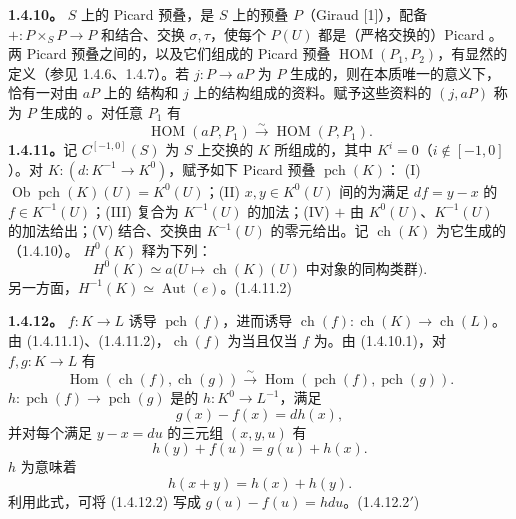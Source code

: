 \textbf{1.4.10。} $S$ 上的 Picard 预叠，是 $S$ 上的预叠 $P$（Giraud [1]），配备 $+:P\times_S P\to P$ 和结合、交换 $\sigma,\tau$，使每个 $P(U)$ 都是（严格交换的）Picard 。两 Picard 预叠之间的，以及它们组成的 Picard 预叠 $\operatorname{HOM}(P_1,P_2)$，有显然的定义（参见 1.4.6、1.4.7）。若 $j:P\to aP$ 为 $P$ 生成的，则在本质唯一的意义下，恰有一对由 $aP$ 上的 结构和 $j$ 上的结构组成的资料。赋予这些资料的 $(j,aP)$ 称为 $P$ 生成的 。对任意  $P_1$ 有
\[\operatorname{HOM}(aP,P_1)\xrightarrow\sim\operatorname{HOM}(P,P_1).\tag{1.4.10.1}\]
\textbf{1.4.11。}记 $C^{[-1,0]}(S)$ 为 $S$ 上交换的 $K$ 所组成的，其中 $K^i=0$（$i\notin[-1,0]$）。对 $K:(d:K^{-1}\to K^0)$，赋予如下 Picard 预叠 $\operatorname{pch}(K)$：
(I) $\operatorname{Ob}\operatorname{pch}(K)(U)=K^0(U)$；(II) $x,y\in K^0(U)$ 间的为满足 $df=y-x$ 的 $f\in K^{-1}(U)$；(III) 复合为 $K^{-1}(U)$ 的加法；(IV)  $+$ 由 $K^0(U)$、$K^{-1}(U)$ 的加法给出；(V) 结合、交换由 $K^{-1}(U)$ 的零元给出。记 $\operatorname{ch}(K)$ 为它生成的 （1.4.10）。 $H^0(K)$ 释为下列：
\[H^0(K)\simeq a\bigl(U\mapsto\operatorname{ch}(K)(U)\text{ 中对象的同构类群}\bigr).\tag{1.4.11.1}\]
另一方面，$H^{-1}(K)\simeq\operatorname{Aut}(e)$。\hfill(1.4.11.2)

\textbf{1.4.12。} $f:K\to L$ 诱导 $\operatorname{pch}(f)$，进而诱导 $\operatorname{ch}(f):\operatorname{ch}(K)\to\operatorname{ch}(L)$。
由 (1.4.11.1)、(1.4.11.2)，$\operatorname{ch}(f)$ 为当且仅当 $f$ 为。由 (1.4.10.1)，对 $f,g:K\to L$ 有
\[\operatorname{Hom}(\operatorname{ch}(f),\operatorname{ch}(g))\xrightarrow\sim\operatorname{Hom}(\operatorname{pch}(f),\operatorname{pch}(g)).\]
 $h:\operatorname{pch}(f)\to\operatorname{pch}(g)$ 是的 $h:K^0\to L^{-1}$，满足
\[g(x)-f(x)=dh(x),\tag{1.4.12.1}\]
并对每个满足 $y-x=du$ 的三元组 $(x,y,u)$ 有
\[h(y)+f(u)=g(u)+h(x).\tag{1.4.12.2}\]
$h$ 为意味着
\[h(x+y)=h(x)+h(y).\tag{1.4.12.3}\]
利用此式，可将 (1.4.12.2) 写成 $g(u)-f(u)=hdu$。\hfill(1.4.12.2$'$)

